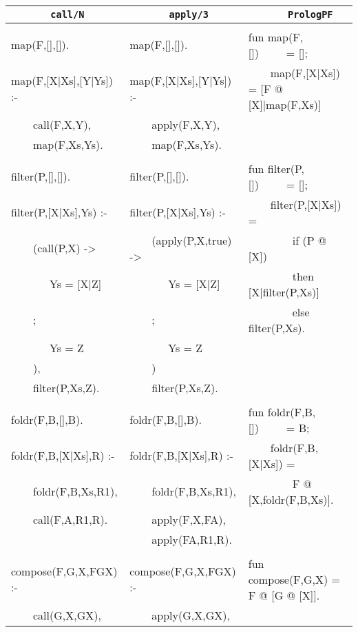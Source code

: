 \begin{table}[htbp]
{\footnotesize
\tt
\begin{tabular}{| l | l | l |}
\hline
\texttt{~~~~~~~call/N}     & \texttt{~~~~~~~apply/3}   &\texttt{~~~~~~~PrologPF}\\
\hline
& & \\
map(F,[],[]).              &map(F,[],[]).              &fun map(F,[])~~~~~= [];\\
map(F,[X|Xs],[Y|Ys]) :-    &map(F,[X|Xs],[Y|Ys]) :-    &~~~~map(F,[X|Xs]) = [F @ [X]|map(F,Xs)]\\
~~~~call(F,X,Y),           &~~~~apply(F,X,Y),          &\\
~~~~map(F,Xs,Ys).          &~~~~map(F,Xs,Ys).          &\\
& & \\
filter(P,[],[]).           &filter(P,[],[]).           &fun filter(P,[])~~~~~= [];\\
filter(P,[X|Xs],Ys) :-     &filter(P,[X|Xs],Ys) :-     &~~~~filter(P,[X|Xs]) =\\ 
~~~~(call(P,X) ->          &~~~~(apply(P,X,true) ->    &~~~~~~~~if (P @ [X])\\
~~~~~~~Ys = [X|Z]          &~~~~~~~Ys = [X|Z]          &~~~~~~~~then [X|filter(P,Xs)]\\
~~~~;                      &~~~~;                      &~~~~~~~~else filter(P,Xs).\\
~~~~~~~Ys = Z              &~~~~~~~Ys = Z              & \\
~~~~),                     &~~~~)                      & \\
~~~~filter(P,Xs,Z).        &~~~~filter(P,Xs,Z).        & \\
& & \\
foldr(F,B,[],B).           &foldr(F,B,[],B).           &fun foldr(F,B,[])~~~~~= B; \\
foldr(F,B,[X|Xs],R) :-     &foldr(F,B,[X|Xs],R) :-     &~~~~foldr(F,B,[X|Xs]) =\\
~~~~foldr(F,B,Xs,R1),      &~~~~foldr(F,B,Xs,R1),      &~~~~~~~~F @ [X,foldr(F,B,Xs)].\\
~~~~call(F,A,R1,R).        &~~~~apply(F,X,FA),         & \\
                           &~~~~apply(FA,R1,R).        & \\
& & \\
compose(F,G,X,FGX) :-      &compose(F,G,X,FGX) :-      &fun compose(F,G,X) = F @ [G @ [X]]. \\
~~~~call(G,X,GX),          &~~~~apply(G,X,GX),         & \\

\end{tabular}}
\end{table}
